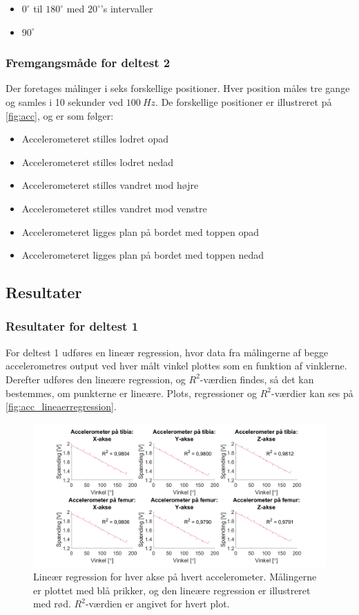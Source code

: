 \begin{itemize}
\item $0^{\circ}$ til $180^{\circ}$ med $20^{\circ}$'s intervaller
\item $90^{\circ}$  
\end{itemize}


\subsubsection{Fremgangsmåde for deltest 2}\label{sec:acc_fremgangsmaade}
Der foretages målinger i seks forskellige positioner. Hver position måles tre gange og samles i 10 sekunder ved $100~Hz$. De forskellige positioner er illustreret på \autoref{fig:acc}, og er som følger: 
\begin{itemize}
\item Accelerometeret stilles lodret opad
\item Accelerometeret stilles lodret nedad
\item Accelerometeret stilles vandret mod højre
\item Accelerometeret stilles vandret mod venstre
\item Accelerometeret ligges plan på bordet med toppen opad
\item Accelerometeret ligges plan på bordet med toppen nedad
\end{itemize}

\subsection{Resultater} 

\subsubsection{Resultater for deltest 1} \label{sec:resul_linear}
For deltest 1 udføres en lineær regression, hvor data fra målingerne af begge accelerometres output ved hver målt vinkel plottes som en funktion af vinklerne. Derefter udføres den lineære regression, og $R^2$-værdien findes, så det kan bestemmes, om punkterne er lineære. Plots, regressioner og $R^2$-værdier kan ses på \autoref{fig:acc_lineaerregression}.

\begin{figure}[H]
\centering
\includegraphics[width=1.0\textwidth]{figures/lineaerregression}
\caption{Lineær regression for hver akse på hvert accelerometer. Målingerne er plottet med blå prikker, og den lineære regression er illustreret med rød. $R^2$-værdien er angivet for hvert plot.}
\label{fig:acc_lineaerregression}
\end{figure}

